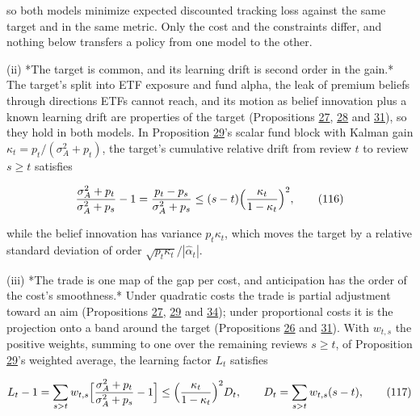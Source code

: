 \documentclass[11pt]{article}
\begin{document}
so both models minimize expected discounted tracking loss against the
same target and in the same metric. Only the cost and the constraints
differ, and nothing below transfers a policy from one model to the
other.

(ii) *The target is common, and its learning drift is second order in
the gain.* The target's split into ETF exposure and fund alpha, the
leak of premium beliefs through directions ETFs cannot reach, and its
motion as belief innovation plus a known learning drift are properties
of the target (Propositions \hyperref[res:Proposition-27]{27}, \hyperref[res:Proposition-28]{28} and \hyperref[res:Proposition-31]{31}), so they hold in both
models. In Proposition \hyperref[res:Proposition-29]{29}'s scalar fund block with Kalman gain
\(\kappa_t=p_t/(\sigma_A^2+p_t)\), the target's cumulative relative drift from
review \(t\) to review \(s\geq t\) satisfies

\begin{equation*}
\frac{\sigma_A^2+p_t}{\sigma_A^2+p_s}-1=\frac{p_t-p_s}{\sigma_A^2+p_s}\leq(s-t)\Bigl(\frac{\kappa_t}{1-\kappa_t}\Bigr)^2,\tag{116}\label{eq:116}
\end{equation*}

while the belief innovation has variance \(p_t\kappa_t\), which moves the
target by a relative standard deviation of order \(\sqrt{p_t\kappa_t}/|\hat\alpha_t|\).

(iii) *The trade is one map of the gap per cost, and anticipation has
the order of the cost's smoothness.* Under quadratic costs the trade is
partial adjustment toward an aim (Propositions \hyperref[res:Proposition-27]{27}, \hyperref[res:Proposition-29]{29} and \hyperref[res:Proposition-34]{34}); under
proportional costs it is the projection onto a band around the target
(Propositions \hyperref[res:Proposition-26]{26} and \hyperref[res:Proposition-31]{31}). With \(w_{t,s}\) the positive weights, summing to
one over the remaining reviews \(s\geq t\), of Proposition \hyperref[res:Proposition-29]{29}'s weighted
average, the learning factor \(L_t\) satisfies

\begin{equation*}
L_t-1=\sum_{s>t}w_{t,s}\Bigl[\frac{\sigma_A^2+p_t}{\sigma_A^2+p_s}-1\Bigr]\leq\Bigl(\frac{\kappa_t}{1-\kappa_t}\Bigr)^2D_t,
\qquad D_t=\sum_{s>t}w_{t,s}(s-t),\tag{117}\label{eq:117}
\end{equation*}
\end{document}
